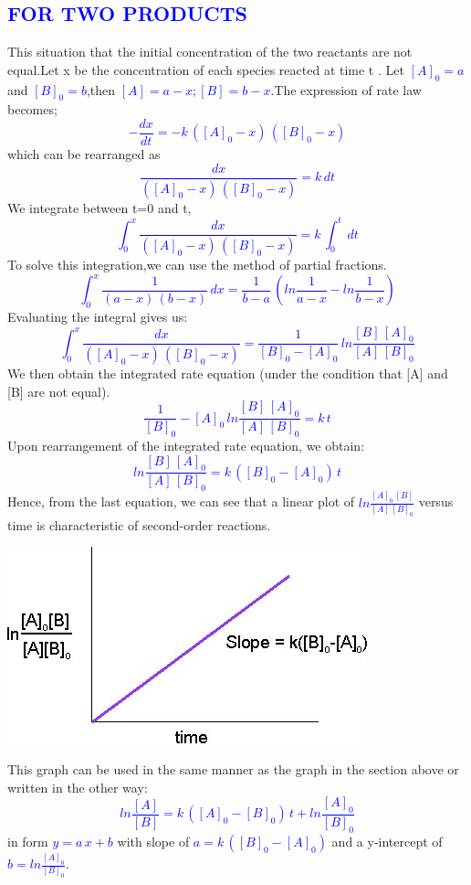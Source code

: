 \documentclass[12pt]{article}
\begin{document}
\subsection{\textcolor{blue}{FOR TWO PRODUCTS}}
\textsf         
           This situation that the initial concentration of the two reactants are not equal.Let x be the concentration of each species reacted at time t .
           Let \textcolor{blue}{${[A]}_0=a$} and \textcolor{blue}{${[B]}_0=b$},then \textcolor{blue}{$[A]=a-x;[B]=b-x$}.The expression of rate law becomes;
           \textcolor{blue}{$$-\frac{dx}{dt}=-k\,({[A]}_0-x)\,({[B]}_0-x)$$} 
           which can be rearranged as
           \textcolor{blue}{$$\frac{dx}{({[A]}_0-x)\,({[B]}_0-x)}=k\,dt$$}
           We integrate between t=0 and t,
           \textcolor{blue}{$$\int_{0}^{x}\frac{dx}{({[A]}_0-x)\,({[B]}_0-x)}=k\,\int_{0}^{t}\,dt$$}
           To solve this integration,we can use the method of partial fractions.
           \textcolor{blue}{$$\int_{0}^{x}\frac{1}{(a-x)\,(b-x)}\,dx=\frac{1}{b-a}\,(ln{\frac{1}{a-x}}-ln{\frac{1}{b-x}})$$}
           Evaluating the integral gives us:
           \textcolor{blue}{$$\int_{0}^{x}\frac{dx}{({[A]}_0-x)\,({[B]}_0-x)}=\frac{1}{{[B]}_0-{[A]}_0}\,ln{\frac{[B]\,{[A]}_0}{[A]\,{[B]}_0}}$$}
           We then obtain the integrated rate equation (under the condition that [A] and [B] are not equal).
           \textcolor{blue}{$$\frac{1}{{[B]}_0}-{[A]}_0\,ln{\frac{[B]\,{[A]}_0}{[A]\,{[B]}_0}}=k\,t$$}
           Upon rearrangement of the integrated rate equation, we obtain:
           \textcolor{blue}{$$ln{\frac{[B]\,{[A]}_0}{[A]\,{[B]}_0}}=k\,({[B]}_0-{[A]}_0)\,t$$}
           Hence, from the last equation, we can see that a linear plot of \textcolor{blue}{$ln{\frac{{[A]}_0\,[B]}{[A]\,{[B]}_0}}$} versus time is characteristic of second-order reactions.
           \newpage
           \begin{center}
  \includegraphics[scale=1.0]{poojan}
\end{center}
           This graph can be used in the same manner as the graph in the section above or written in the other way:
           \textcolor{blue}{$$ln{\frac{[A]}{[B]}}=k\,({[A]}_0-{[B]}_0)\,t+ln{\frac{{[A]}_0}{{[B]}_0}}$$}
         in form \textcolor{blue}{$y=a\,x+b$} with slope of \textcolor{blue}{$a=k\,({[B]}_0-{[A]}_0)$} and a y-intercept of \textcolor{blue}{$b=ln{\frac{{[A]}_0}{{[B]}_0}}$}.
         
\end{document}

